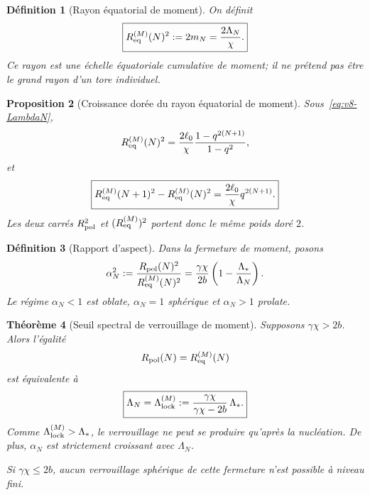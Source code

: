 \documentclass[11pt,a4paper]{article}
\newtheorem{theorem}{Théorème}[section]
\newtheorem{proposition}[theorem]{Proposition}
\newtheorem{definition}[theorem]{Définition}
\begin{document}
\begin{definition}[Rayon équatorial de moment]\label{def:v8-moment-equator}
On définit
\begin{equation}\label{eq:v8-ReqM}
 \boxed{
 R_{\rm eq}^{(M)}(N)^2
 :=2m_N
 =\frac{2\Lambda_N}{\chi}.}
\end{equation}
Ce rayon est une \emph{échelle équatoriale cumulative de moment}; il ne prétend pas être le grand rayon d'un tore individuel.
\end{definition}

\begin{proposition}[Croissance dorée du rayon équatorial de moment]\label{prop:v8-ReqM-growth}
Sous~\eqref{eq:v8-LambdaN},
\begin{equation}\label{eq:v8-ReqM-explicit}
 R_{\rm eq}^{(M)}(N)^2
 =
 \frac{2\ell_0}{\chi}
 \frac{1-q^{2(N+1)}}{1-q^2},
\end{equation}
et
\begin{equation}\label{eq:v8-ReqM-increment}
 \boxed{
 R_{\rm eq}^{(M)}(N+1)^2-R_{\rm eq}^{(M)}(N)^2
 =\frac{2\ell_0}{\chi}q^{2(N+1)}.}
\end{equation}
Les deux carrés $R_{\rm pol}^2$ et $(R_{\rm eq}^{(M)})^2$ portent donc le même poids doré $2$.
\end{proposition}

\begin{definition}[Rapport d'aspect]\label{def:v8-aspect}
Dans la fermeture de moment, posons
\begin{equation}\label{eq:v8-aspect}
 \alpha_N^2
 :=
 \frac{R_{\rm pol}(N)^2}{R_{\rm eq}^{(M)}(N)^2}
 =
 \frac{\gamma\chi}{2b}
 \left(1-\frac{\Lambda_*}{\Lambda_N}\right).
\end{equation}
Le régime $\alpha_N<1$ est oblate, $\alpha_N=1$ sphérique et $\alpha_N>1$ prolate.
\end{definition}

\begin{theorem}[Seuil spectral de verrouillage de moment]\label{thm:v8-moment-lock}
Supposons $\gamma\chi>2b$. Alors l'égalité
\[
 R_{\rm pol}(N)=R_{\rm eq}^{(M)}(N)
\]
est équivalente à
\begin{equation}\label{eq:v8-Lambda-lock}
 \boxed{
 \Lambda_N=\Lambda_{\rm lock}^{(M)}
 :=
 \frac{\gamma\chi}{\gamma\chi-2b}\,\Lambda_*.}
\end{equation}
Comme $\Lambda_{\rm lock}^{(M)}>\Lambda_*$, le verrouillage ne peut se produire qu'après la nucléation. De plus, $\alpha_N$ est strictement croissant avec $\Lambda_N$.

Si $\gamma\chi\le2b$, aucun verrouillage sphérique de cette fermeture n'est possible à niveau fini.
\end{theorem}
\end{document}
